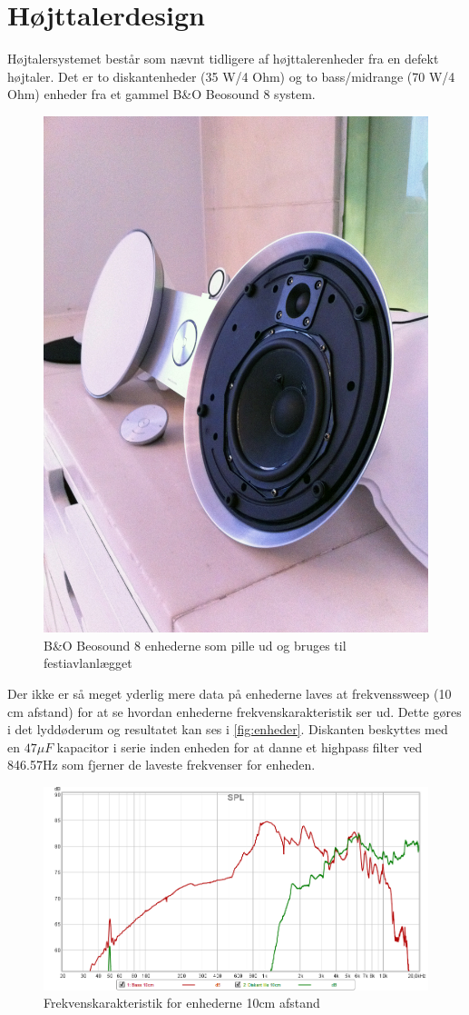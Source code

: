 \section{Højttalerdesign}
Højtalersystemet består som nævnt tidligere af højttalerenheder fra en defekt højtaler. Det er to diskantenheder (35 W/4 Ohm) og to bass/midrange (70 W/4 Ohm) enheder fra et gammel B\&O Beosound 8 system. 
\begin{figure}[H] 
	\center
		\includegraphics[width=.4\linewidth]{figur/bs8_enheder}\quad
		\caption{B\&O Beosound 8 enhederne som pille ud og bruges til festiavlanlægget}
		\label{fig:speakers}
\end{figure}

Der ikke er så meget yderlig mere data på enhederne laves at frekvenssweep (10 cm afstand) for at se hvordan enhederne frekvenskarakteristik ser ud. Dette gøres i det lyddøderum og resultatet kan ses i \autoref{fig:enheder}. Diskanten beskyttes med en $47\mu F$ kapacitor i serie inden enheden for at danne et highpass filter ved 846.57Hz som fjerner de laveste frekvenser for enheden.

\begin{figure}[H] 
	\center
		\includegraphics[width=.9\linewidth]{figur/Enheder-10cm}\quad
		\caption{Frekvenskarakteristik for enhederne 10cm afstand}
		\label{fig:enheder}
\end{figure}

